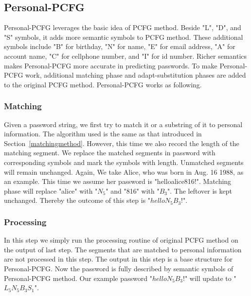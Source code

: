\subsection{Personal-PCFG}
Personal-PCFG leverages the basic idea of PCFG method. Beside "L", "D", and "S" symbols, it adds more semantic symbols to PCFG method. These additional symbols include "B" for birthday, "N" for name, "E" for email address, "A" for account name, "C" for cellphone number, and "I" for id number. Richer semantics makes Personal-PCFG more accurate in predicting passwords. To make Personal-PCFG work, additional matching phase and adapt-substitution phases are added to the original PCFG method. Personal-PCFG works as following.
\subsubsection{Matching}
Given a password string, we first try to match it or a substring of it to personal information. The algorithm used is the same as that introduced in Section~\ref{matchingmethod}. However, this time we also record the length of the matching segment. We replace the matched segments in password with corresponding symbols and mark the symbols with length. Unmatched segments will remain unchanged. Again, We take Alice, who was born in Aug. 16 1988, as an example. This time we assume her password is "helloalice816!". Matching phase will replace "alice" with "$N_5$" and "816" with "$B_3$". The leftover is kept unchanged. Thereby the outcome of this step is "$helloN_5B_3!$". 
\subsubsection{Processing}
In this step we simply run the processing routine of original PCFG method on the output of last step. The segments that are matched to personal information are not processed in this step. The output in this step is a base structure for Personal-PCFG. Now the password is fully described by semantic symbols of Personal-PCFG method. Our example password "$helloN_5B_3!$" will update to "$L_5N_5B_3S_1$". 

